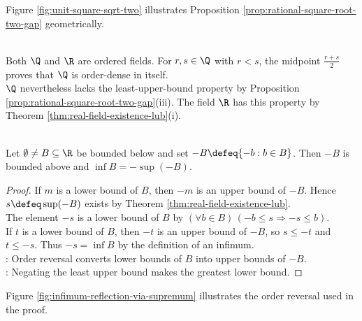\begin{illustrationfigure}[H]
  \centering
  
  \caption{The diagonal of a unit square has length $\sqrt{2}$, so the rational gap is geometric as well as algebraic.}
  \label{fig:unit-square-sqrt-two}
\end{illustrationfigure}
Figure \ref{fig:unit-square-sqrt-two} illustrates Proposition \ref{prop:rational-square-root-two-gap} geometrically.

\begin{remark} \label{rem:rational-density-does-not-fill-gaps} \\
Both $\Q$ and $\R$ are ordered fields. For $r,s\in\Q$ with $r<s$, the midpoint $\frac{r+s}{2}$ proves that $\Q$ is order-dense in itself.\\
$\Q$ nevertheless lacks the least-upper-bound property by Proposition \ref{prop:rational-square-root-two-gap}(iii). The field $\R$ has this property by Theorem \ref{thm:real-field-existence-lub}(i).
\end{remark}

\begin{corollary} \label{cor:infimum-as-negative-supremum} \\
Let $\emptyset\neq B\subseteq\R$ be bounded below and set $-B\defeq\{-b:b\in B\}$. Then $-B$ is bounded above and $\inf B=-\sup(-B)$.
\begin{proof}
If $m$ is a lower bound of $B$, then $-m$ is an upper bound of $-B$. Hence $s\defeq\sup(-B)$ exists by Theorem \ref{thm:real-field-existence-lub}.\\
The element $-s$ is a lower bound of $B$ by $(\forall b\in B)\,(-b\leq s\Rightarrow-s\leq b)$.\\
If $t$ is a lower bound of $B$, then $-t$ is an upper bound of $-B$, so $s\leq-t$ and $t\leq-s$. Thus $-s=\inf B$ by the definition of an infimum.\\
: Order reversal converts lower bounds of $B$ into upper bounds of $-B$.\\
: Negating the least upper bound makes the greatest lower bound.
\end{proof}
\end{corollary}

\begin{illustrationfigure}[H]
  \centering
  
  \caption{Reflecting $B$ through $0$ turns lower bounds of $B$ into upper bounds of $-B$, so $\inf B=-\sup(-B)$.}
  \label{fig:infimum-reflection-via-supremum}
\end{illustrationfigure}
Figure \ref{fig:infimum-reflection-via-supremum} illustrates the order reversal used in the proof.

